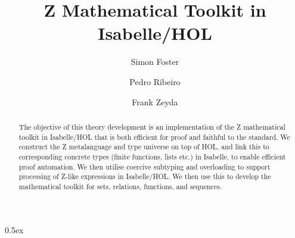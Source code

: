 \documentclass[11pt,a4paper]{article}
\begin{document}
\title{Z Mathematical Toolkit in Isabelle/HOL}
\author{Simon Foster \and Pedro Ribeiro \and Frank Zeyda}
\maketitle

\begin{abstract}
\noindent The objective of this theory development is an implementation of the Z mathematical 
toolkit in Isabelle/HOL that is both efficient for proof and faithful to the standard.
We construct the Z metalanguage and type universe on top of HOL, and link this to
corresponding concrete types (finite functions, lists etc.) in Isabelle, to enable
efficient proof automation. We then utilise coercive subtyping and overloading to
support processing of Z-like expressions in Isabelle/HOL. We then use this to develop
the mathematical toolkit for sets, relations, functions, and sequences.
\end{abstract}

\tableofcontents

\parindent 0pt\parskip 0.5ex





\end{document}
